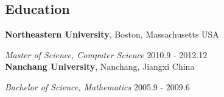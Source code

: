 \documentclass[margin,line]{res}
\begin{document}
\begin{resume}
\section{\sc Education}
{\bf Northeastern University}, Boston, Massachusetts USA

\vspace{-.3cm}
{\em Master of Science, Computer Science} \hfill {2010.9 - 2012.12}\\

{\bf Nanchang University}, Nanchang, Jiangxi China

\vspace{-.3cm}
{\em Bachelor of Science, Mathematics} \hfill {2005.9 - 2009.6}\\


\end{resume}
\end{document}

